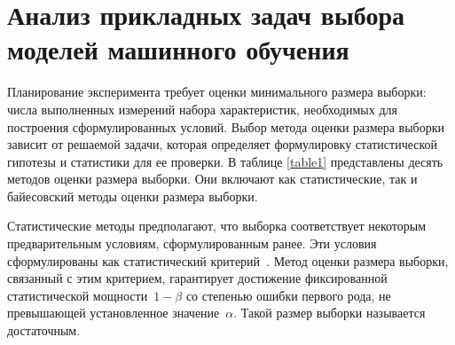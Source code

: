 \chapter{Анализ прикладных задач выбора моделей машинного обучения}
Планирование эксперимента требует оценки минимального размера выборки: числа выполненных измерений набора характеристик, необходимых для построения сформулированных условий. Выбор метода оценки размера выборки зависит от решаемой задачи, которая определяет формулировку статистической гипотезы и статистики для ее проверки. В таблице \ref{table1} представлены десять методов оценки размера выборки. Они включают как статистические, так и байесовский методы оценки размера выборки.

Статистические методы предполагают, что выборка соответствует некоторым предварительным условиям, сформулированным ранее. Эти условия сформулированы как статистический критерий~\cite{self1988,self1992,shieh2000,demidenko2007}. Метод оценки размера выборки, связанный с этим критерием, гарантирует достижение фиксированной статистической мощности~$1-\beta$ со степенью ошибки первого рода, не превышающей установленное значение~$\alpha$. Такой размер выборки называется достаточным.

